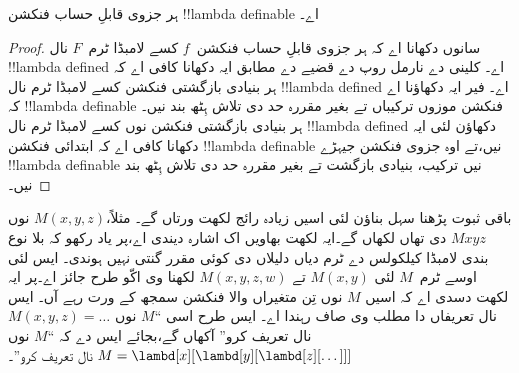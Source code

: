 \documentclass[../../../include/open-logic-section]{subfiles}
\begin{document}

\begin{thm}
ہر جزوی قابلِ حساب فنکشن !!{lambda definable} اے۔
\end{thm}

\begin{proof}
سانوں دکھانا اے کہ ہر جزوی قابلِ حساب فنکشن~$f$ کسے
لامبڈا ٹرم~$F$ نال !!{lambda defined} اے۔ کلینی دے
نارمل روپ دے قضیے دے مطابق ایہ دکھانا کافی اے کہ ہر
بنیادی بازگشتی فنکشن کسے لامبڈا ٹرم نال !!{lambda defined}
اے۔ فیر ایہ دکھاؤنا اے کہ !!{lambda definable} فنکشن موزوں
ترکیباں تے بغیر مقررہ حد دی تلاش ہِٹھ بند نیں۔ہر بنیادی بازگشتی
فنکشن نوں کسے لامبڈا ٹرم نال !!{lambda defined} دکھاؤن
لئی ایہ دکھانا کافی اے کہ ابتدائی فنکشن !!{lambda definable}
نیں،تے اوہ جزوی فنکشن جیہڑے !!{lambda definable} نیں
ترکیب، بنیادی بازگشت تے بغیر مقررہ حد دی تلاش ہِٹھ بند نیں۔
\end{proof}

باقی ثبوت پڑھنا سہل بناؤن لئی اسیں زیادہ رائج لکھت ورتاں گے۔
مثلاً،$M(x, y, z)$ نوں $Mxyz$ دی تھاں لکھاں گے۔ایہ لکھت
بھاویں اک اشارہ دیندی اے،پر یاد رکھو کہ بلا نوع بندی لامبڈا
کیلکولس دے ٹرم دیاں دلیلاں دی کوئی مقرر گنتی نہیں ہوندی۔ ایس لئی اوسے ٹرم~$M$ لئی $M(x,y)$ تے
$M(x,y,z,w)$ لکھنا وی اکّو طرح جائز اے۔پر ایہ لکھت
دسدی اے کہ اسیں $M$ نوں تِن متغیراں والا فنکشن سمجھ کے ورت رہے آں۔
ایس نال تعریفاں دا مطلب وی صاف رہندا اے۔
ایس طرح اسی ``$M$ نوں $M(x,y,z) = \dots$ نال تعریف کرو''
آکھاں گے،بجائے ایس دے کہ ``$M$ نوں
$M = \lambd[x][\lambd[y][\lambd[z][\dots]]]$ نال تعریف کرو''۔
\end{document}
